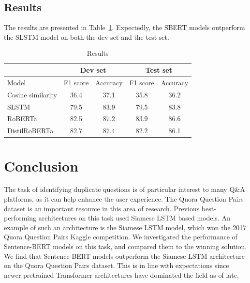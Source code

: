 \documentclass[10pt, a4paper]{article}
\begin{document}
\subsection{Results} \label{results}

The results are presented in Table~\ref{tab:results}.
Expectedly, the SBERT models outperform the SLSTM model on both the dev set and the test set.

\begin{table}
\caption{Results}
\label{tab:results}
\begin{center}
\begin{tabular}{lcccc}
\toprule
 & \multicolumn{2}{c}{Dev set} & \multicolumn{2}{c}{Test set} \\
\midrule
Model & F1 score & Accuracy & F1 score & Accuracy \\
\midrule
Cosine similarity & 36.4 & 37.1 & 35.8 & 36.2 \\
SLSTM & 79.5 & 83.9 & 79.5 & 83.8 \\
RoBERTa & 82.5 & 87.2 & 83.9 & 86.6 \\
DistilRoBERTa & 82.7 & 87.4 & 82.2 & 86.1 \\
\bottomrule
\end{tabular}
\end{center}
\end{table}

\section{Conclusion} \label{conclusion}

The task of identifying duplicate questions is of particular interest to many Q\&A platforms, as it can help enhance the user experience.
The Quora Question Pairs dataset is an important resource in this area of research. Previous best-performing architectures on this task used Siamese LSTM based models.
An example of such an architecture is the Siamese LSTM model, which won the 2017 Quora Question Pairs Kaggle competition.
We investigated the performance of Sentence-BERT models on this task, and compared them to the winning solution.
We find that Sentence-BERT models outperform the Siamese LSTM architecture on the Quora Question Pairs dataset.
This is in line with expectations since newer pretrained Transformer architectures have dominated the field as of late.


 
\end{document}
